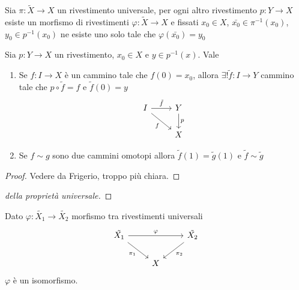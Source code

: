 \documentclass[]{article}
\begin{document}
\begin{proposition} 
    Sia $\pi: \tilde{X} \to X$ un rivestimento universale, per ogni altro rivestimento $p: Y \to X$ esiste un morfismo
    di rivestimenti $\varphi: \tilde{X} \to X$ e fissati $x_0 \in X$, $\bar{x_0}\in \pi^{-1}(x_0)$, $y_0 \in p^{-1}(x_0)$
    ne esiste uno solo tale che $\varphi(\bar{x_0}) = y_0$
\end{proposition}

\begin{theorem}  \nl
    Sia $p: Y \to X$ un rivestimento, $x_0 \in X$ e $y \in p^{-1}(x)$. Vale \nl
    \begin{enumerate}
        \item Se $f: I \to X$ \`e un cammino tale che $f(0) = x_0$, allora
            $\exists! \tilde{f}: I \to Y$ cammino tale che $p \circ \tilde{f} = f$ e $\tilde{f}(0) = y$
            \[\begin{tikzcd}
            I & Y \\
            & X
            \arrow["{\tilde{f}}", from=1-1, to=1-2]
            \arrow["f"', from=1-1, to=2-2]
            \arrow["p", from=1-2, to=2-2]
        \end{tikzcd}\]
        \item Se $f \sim g$ sono due cammini omotopi allora $\tilde{f}(1) = \tilde{g}(1)$ e $\tilde{f} \sim \tilde{g}$ 
    \end{enumerate}
\end{theorem}

\begin{proof}
    Vedere da Frigerio, troppo pi\`u chiara.
\end{proof}

\begin{proof} [della propriet\`a universale] \nl
    
\end{proof}

\begin{corollary} \nl
    Dato $\varphi: \tilde{X_1} \to \tilde{X_2}$ morfismo tra rivestimenti universali
    \[\begin{tikzcd}
	{\tilde{X_1}} && {\tilde{X_2}} \\
	& X
	\arrow["\varphi", from=1-1, to=1-3]
	\arrow["{\pi_1}"', from=1-1, to=2-2]
	\arrow["{\pi_2}", from=1-3, to=2-2]
    \end{tikzcd}\]
    $\varphi$ \`e un isomorfismo.
\end{corollary}
\end{document}
